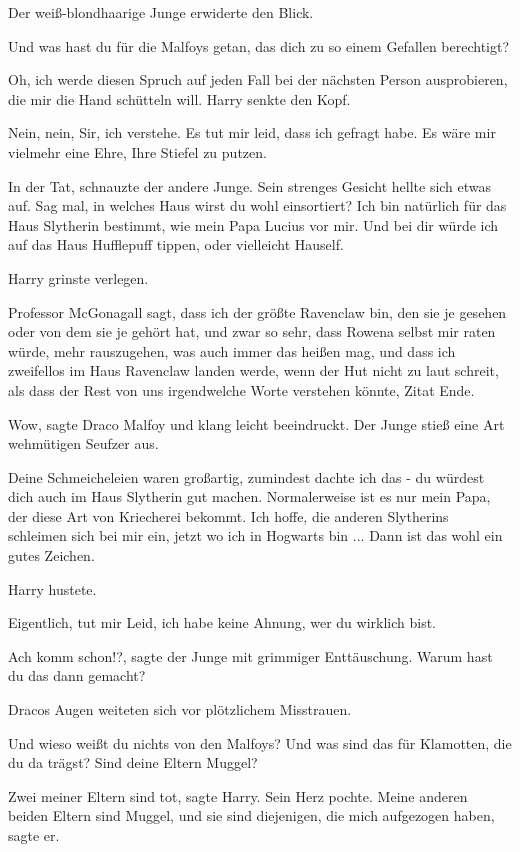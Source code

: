 Der weiß-blondhaarige Junge erwiderte den Blick.

\glqq{}Und was hast du für die Malfoys getan, das dich zu so einem Gefallen
berechtigt?\grqq{}

Oh, ich werde diesen Spruch auf jeden Fall bei der nächsten Person ausprobieren,
die mir die Hand schütteln will. Harry senkte den Kopf.

\glqq{}Nein, nein, Sir, ich verstehe. Es tut mir leid, dass ich gefragt habe. Es
wäre mir vielmehr eine Ehre, Ihre Stiefel zu putzen.\grqq{}

\glqq{}In der Tat\grqq{}, schnauzte der andere Junge. Sein strenges Gesicht
hellte sich etwas auf. \glqq{}Sag mal, in welches Haus wirst du wohl einsortiert?
Ich bin natürlich für das Haus Slytherin bestimmt, wie mein Papa Lucius vor
mir. Und bei dir würde ich auf das Haus Hufflepuff tippen, oder vielleicht
Hauself.

Harry grinste verlegen.

\glqq{}Professor McGonagall sagt, dass ich der größte Ravenclaw bin, den sie je
gesehen oder von dem sie je gehört hat, und zwar so sehr, dass Rowena selbst mir
raten würde, mehr rauszugehen, was auch immer das heißen mag, und dass ich
zweifellos im Haus Ravenclaw landen werde, wenn der Hut nicht zu laut schreit,
als dass der Rest von uns irgendwelche Worte verstehen könnte, Zitat
Ende.\grqq{}

\glqq{}Wow\grqq{}, sagte Draco Malfoy und klang leicht beeindruckt. Der Junge
stieß eine Art wehmütigen Seufzer aus.

\glqq{}Deine Schmeicheleien waren großartig, zumindest dachte ich das - du
würdest dich auch im Haus Slytherin gut machen. Normalerweise ist es nur mein
Papa, der diese Art von Kriecherei bekommt. Ich hoffe, die anderen Slytherins
schleimen sich bei mir ein, jetzt wo ich in Hogwarts bin ... Dann ist das wohl
ein gutes Zeichen.\grqq{}

Harry hustete.

\glqq{}Eigentlich, tut mir Leid, ich habe keine Ahnung, wer du wirklich
bist.\grqq{}

\glqq{}Ach komm schon!?\grqq{}, sagte der Junge mit grimmiger Enttäuschung. \glqq{}
Warum hast du das dann gemacht?\grqq{}

Dracos Augen weiteten sich vor plötzlichem Misstrauen.

\glqq{}Und wieso weißt du nichts von den Malfoys? Und was sind das für Klamotten,
die du da trägst? Sind deine Eltern Muggel?\grqq{}

\glqq{}Zwei meiner Eltern sind tot\grqq{}, sagte Harry. Sein Herz pochte. \glqq{}
Meine anderen beiden Eltern sind Muggel, und sie sind diejenigen, die mich
aufgezogen haben\grqq{}, sagte er.

